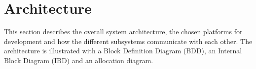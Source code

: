 
\chapter{Architecture}
\label{sec:Architecture}
This section describes the overall system architecture, the chosen platforms for development and how the different subsystems communicate with each other.
The architecture is illustrated with a Block Definition Diagram (BDD), an Internal Block Diagram (IBD) and an allocation diagram.


\FloatBarrier